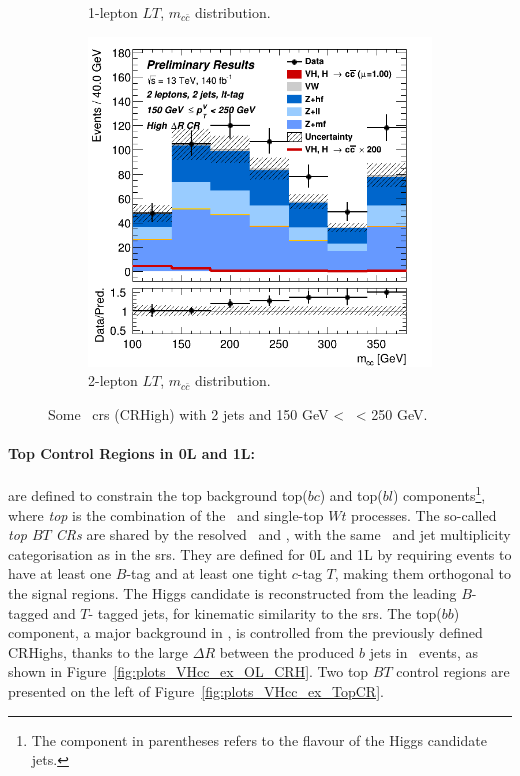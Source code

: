 \begin{figure}[h!]
\begin{subfigure}[b]{0.32\textwidth}
      \caption{1-lepton $LT$, $m_{c\bar{c}}$ distribution.}
      \label{fig:plots_VHcc_ex_1L_CRH}
  \end{subfigure}
  \begin{subfigure}[b]{0.32\textwidth}
    \centering
    \includegraphics[width=\textwidth]{Images/VH/Own_fit/prefit_VHcc/Region_distmBB_BMax250_BMin150_DCRHigh_J2_TTypelt_T2_L2_Y6051_Prefit.png}
    \caption{2-lepton $LT$, $m_{c\bar{c}}$ distribution.}
    \label{fig:plots_VHcc_ex_2L_CRH}
\end{subfigure}
  \caption{Some \highdr\ \glspl{cr} (CRHigh) with 2 jets and 150 GeV < \ptv\ < 250 GeV.}
  \label{fig:plots_VHcc_ex_CRH}
\end{figure} 

\paragraph{Top Control Regions in 0L and 1L:} are defined to constrain the top background top($bc$) and top($bl$) components\footnote{The component in parentheses refers to the flavour of the Higgs candidate jets.}, where \textit{top} is the combination of the \ttb\ and single-top $Wt$ processes. The so-called \textit{top $BT$ CRs} are shared by the resolved \vhb\ and \vhc, with the same \ptv\ and jet multiplicity categorisation as in the \glspl{sr}.  They are defined for 0L and 1L by requiring events to have at least one $B$-tag and at least one tight $c$-tag $T$, making them orthogonal to the signal regions. The Higgs candidate is reconstructed from the leading $B$-tagged and $T$- tagged jets, for kinematic similarity to the \glspl{sr}. The top($bb$) component, a major background in \vhb, is controlled from the previously defined CRHighs, thanks to the large $\Delta R$ between the produced $b$ jets in \ttb\ events, as shown in Figure~\ref{fig:plots_VHcc_ex_OL_CRH}. Two top $BT$ control regions are presented on the left of Figure~\ref{fig:plots_VHcc_ex_TopCR}.

